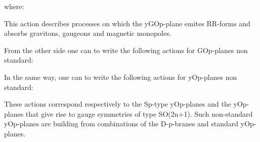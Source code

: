 \documentclass[a4paper,a4paper]{article}
\begin{document}
where:

\begin{center}
{  \coordHE{} }
\end{center}

\begin{center}
{  \coordHE{} }
\end{center}

This action describes processes on which the yGOp-plane emites RR-forms and absorbs gravitons, gaugeons and magnetic monopoles.

From the other side one can to write the following actions for GOp-planes non 
standard:

\begin{center}
{  \coordHE{} }
\end{center}

\begin{center}
{  \coordHE{} }
\end{center}
In the same way, one can to write the following actions for yOp-planes non standard:
\begin{center}
{  \coordHE{} }
\end{center}
\begin{center}
{  \coordHE{} }
\end{center}
These actions correspond respectively to the Sp-type yOp-planes and the yOp-planes that give rise to gauge symmetries of type SO(2n+1).  Such non-standard yOp-planes are building from combinations of the D-p-branes and standard yOp-planes.
\end{document}
